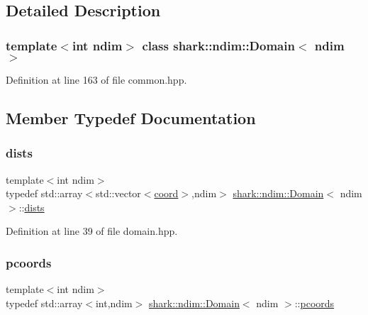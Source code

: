 \subsection{Detailed Description}
\subsubsection*{template$<$int ndim$>$\newline
class shark\+::ndim\+::\+Domain$<$ ndim $>$}



Definition at line 163 of file common.\+hpp.



\subsection{Member Typedef Documentation}
\hypertarget{classshark_1_1ndim_1_1_domain_a8d425ae958ccde33494fe1346307e991}{}\label{classshark_1_1ndim_1_1_domain_a8d425ae958ccde33494fe1346307e991} 
\subsubsection{\texorpdfstring{dists}{dists}}
{\footnotesize\ttfamily template$<$int ndim$>$ \\
typedef std\+::array$<$std\+::vector$<$\hyperlink{namespaceshark_a767a92d5dd82cb82266473bff42fa6d9}{coord}$>$,ndim$>$ \hyperlink{classshark_1_1ndim_1_1_domain}{shark\+::ndim\+::\+Domain}$<$ ndim $>$\+::\hyperlink{classshark_1_1ndim_1_1_domain_a8d425ae958ccde33494fe1346307e991}{dists}}



Definition at line 39 of file domain.\+hpp.

\hypertarget{classshark_1_1ndim_1_1_domain_a9684ccd8af33cff7639c782290ac37ee}{}\label{classshark_1_1ndim_1_1_domain_a9684ccd8af33cff7639c782290ac37ee} 
\subsubsection{\texorpdfstring{pcoords}{pcoords}}
{\footnotesize\ttfamily template$<$int ndim$>$ \\
typedef std\+::array$<$int,ndim$>$ \hyperlink{classshark_1_1ndim_1_1_domain}{shark\+::ndim\+::\+Domain}$<$ ndim $>$\+::\hyperlink{classshark_1_1ndim_1_1_domain_a9684ccd8af33cff7639c782290ac37ee}{pcoords}}



